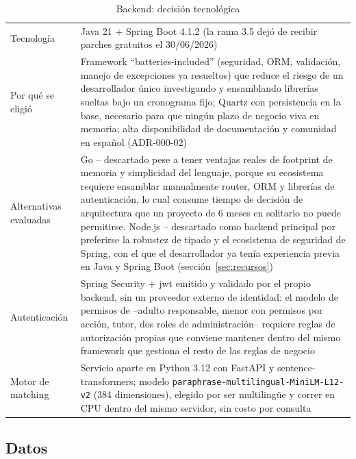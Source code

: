 \begin{table}[H]
    \centering
    \caption{Backend: decisión tecnológica}
    \label{tab:stack-backend}
    \small
    \begin{tabularx}{\textwidth}{l L}
        \toprule
         &  \\
        \midrule
        Tecnología & Java 21 + Spring Boot 4.1.2 (la rama 3.5 dejó de recibir parches gratuitos el 30/06/2026) \\
        Por qué se eligió & Framework ``batteries-included'' (seguridad, ORM, validación, manejo de excepciones ya resueltos) que reduce el riesgo de un desarrollador único investigando y ensamblando librerías sueltas bajo un cronograma fijo; Quartz con persistencia en la base, necesario para que ningún plazo de negocio viva en memoria; alta disponibilidad de documentación y comunidad en español (ADR-000-02) \\
        Alternativas evaluadas & Go -- descartado pese a tener ventajas reales de footprint de memoria y simplicidad del lenguaje, porque su ecosistema requiere ensamblar manualmente router, ORM y librerías de autenticación, lo cual consume tiempo de decisión de arquitectura que un proyecto de 6 meses en solitario no puede permitirse. Node.js -- descartado como backend principal por preferirse la robustez de tipado y el ecosistema de seguridad de Spring, con el que el desarrollador ya tenía experiencia previa en Java y Spring Boot (sección~\ref{sec:recursos}) \\
        Autenticación & Spring Security + \gls{jwt} emitido y validado por el propio backend, sin un proveedor externo de identidad: el modelo de permisos de \sistema{} --adulto responsable, menor con permisos por acción, tutor, dos roles de administración-- requiere reglas de autorización propias que conviene mantener dentro del mismo framework que gestiona el resto de las reglas de negocio \\
        Motor de \gls{matching} & Servicio aparte en Python 3.12 con FastAPI y sentence-transformers; modelo \texttt{paraphrase-}\allowbreak\texttt{multilingual-}\allowbreak\texttt{MiniLM-L12-v2} (384 dimensiones), elegido por ser multilingüe y correr en CPU dentro del mismo servidor, sin costo por consulta \\
        \bottomrule
    \end{tabularx}
\end{table}

\subsection{Datos}

